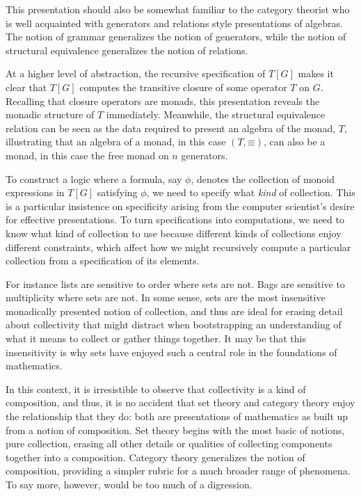 \documentclass[]{acm_proc_article-sp}
\newcommand{\scong}{\mathbin{\equiv}}
\numberwithin{equation}{subsection}
\begin{document}
This presentation should also be somewhat familiar to the category
theorist who is well acquainted with generators and relations style
presentations of algebras. The notion of grammar generalizes the
notion of generators, while the notion of structural equivalence
generalizes the notion of relations.

At a higher level of abstraction, the recursive specification of
$T[G]$ makes it clear that $T[G]$ computes the transitive closure of
some operator $T$ on $G$. Recalling that closure operators are monads,
this presentation reveals the monadic structure of $T$
immediately. Meanwhile, the structural equivalence relation can be
seen as the data required to present an algebra of the monad, $T$,
illustrating that an algebra of a monad, in this case $(T,\scong)$,
can also be a monad, in this case the free monad on $n$ generators.

To construct a logic where a formula, say $\phi$, denotes the
collection of monoid expressions in $T[G]$ satisfying $\phi$, we need
to specify what \emph{kind} of collection. This is a particular
insistence on specificity arising from the computer scientist's desire
for effective presentations. To turn specifications into computations,
we need to know what kind of collection to use because different kinds
of collections enjoy different constraints, which affect how we might
recursively compute a particular collection from a specification of
its elements.

For instance lists are sensitive to order where sets are not. Bags are
sensitive to multiplicity where sets are not. In some sense, sets are
the most insensitive monadically presented notion of collection, and
thus are ideal for erasing detail about collectivity that might
distract when bootstrapping an understanding of what it means to
collect or gather things together. It may be that this insensitivity
is why sets have enjoyed such a central role in the foundations of
mathematics.

In this context, it is irresistible to observe that collectivity is a
kind of composition, and thus, it is no accident that set theory and
category theory enjoy the relationship that they do: both are
presentations of mathematics as built up from a notion of
composition. Set theory begins with the most basic of notions, pure
collection, erasing all other details or qualities of collecting
components together into a composition. Category theory generalizes
the notion of composition, providing a simpler rubric for a much
broader range of phenomena. To say more, however, would be too much of
a digression.
\end{document}
